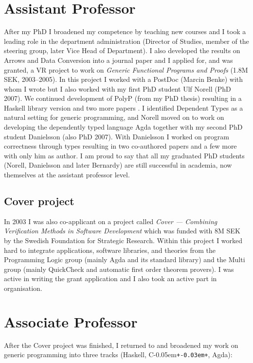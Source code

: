 \documentclass[11pt,twoside,twocolumn]{article}
\providecommand{\cpp}{C\kern-0.05em\texttt{+\kern-0.03em+}}
\providecommand{\Cpp}{\cpp}
\begin{document}
\section{Assistant Professor}
After my PhD I broadened my competence by teaching new courses and I
took a leading role in the department administration (Director of
Studies, member of the steering group, later Vice Head of Department).
%
I also developed the results on Arrows and Data Conversion into a
journal paper \citep{janssonjeuring-dataconv} and I applied for, and
was granted, a VR project to work on \emph{Generic Functional Programs
  and Proofs} (1.8M SEK, 2003--2005).
%
In this project I worked with a PostDoc (Marcin Benke) with whom I
wrote \citep{benkedybjerjansson2003:gendepty} but I also worked with my
first PhD student Ulf Norell (PhD 2007).
%
We continued development of PolyP (from my PhD thesis) resulting in a
Haskell library version \citep{jansson:PolyP2compiler} and two more
papers \citep{norelljansson2003:PolyHaskell, norelljansson04:ProtoGen}.
%
I identified Dependent Types as a natural setting for generic
programming, and Norell moved on to work on developing the dependently
typed language Agda together with my second PhD student Danielsson
(also PhD 2007).
%
With Danielsson I worked on program correctness through types
resulting in two co-authored papers
\citep{danielssonjansson04:chasingbottoms,
  danielssonetal06:fastandloose} and a few more with only him as
author.
%
I am proud to say that all my graduated PhD students (Norell,
Danielsson and later Bernardy) are still successful in academia, now
themselves at the assistant professor level.

\subsection{Cover project}
In 2003 I was also co-applicant on a project called \emph{Cover ---
  Combining Verification Methods in Software Development} which was
funded with 8M SEK by the Swedish Foundation for Strategic Research.
%
Within this project I worked hard to integrate applications, software
libraries, and theories from the Programming Logic group (mainly Agda
and its standard library) and the Multi group (mainly QuickCheck and
automatic first order theorem provers).
%
I was active in writing the grant application and I also took an
active part in organisation.

\section{Associate Professor}
After the Cover project was finished, I returned to and broadened my
work on generic programming into three tracks (Haskell, \Cpp, Agda):
%
\end{document}
